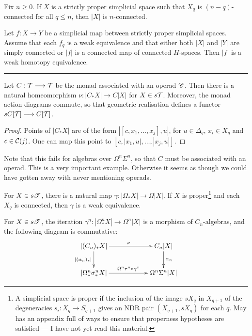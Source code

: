 \documentclass[11pt]{article}
\begin{document}
\begin{Operads}
\begin{thm*}[11.12]
Fix $n\geq0$. If $X$ is a strictly proper simplicial space such that $X_q$ is $(n-q)$-connected for all $q\leq n$, then $|X|$ is $n$-connected.
\end{thm*}
\begin{thm*}[11.13]
Let $f:X\to Y$ be a simplicial map between strictly proper simplicial spaces. Assume that each $f_q$ is a weak equivalence and that either both $|X|$ and $|Y|$ are simply connected or $|f|$ is a connected map of connected $H$-spaces. Then $|f|$ is a weak homotopy equivalence.
\end{thm*}
\hrule
\begin{thm*}[12.2]
Let $C:\mathcal{T}\longrightarrow\mathcal{T}$ be the monad associated with an operad $\mathscr{C}$. Then there is a natural homeomorphism $\nu:|C_*X|\to C|X|$ for $X\in s\mathcal{T}$. Moreover, the monad action diagrams commute, so that geometric realisation defines a functor $sC[\mathcal{T}]\longrightarrow C[\mathcal{T}]$.
\end{thm*}
\begin{proof}
Points of $|C_*X|$ are of the form $|[c,x_1,\ldots,x_j],u|$, for $u\in\Delta_q$, $x_i\in X_q$ and $c\in\mathcal{C}(j)$. One can map this point to $[c,|x_1,u|,\ldots,|x_j,u|]$.
\end{proof}
\noindent Note that this fails for algebras over $\Omega^n\Sigma^n$, so that $C$ must be associated with an operad. This is a very important example. Otherwise it seems as though we could have gotten away with never mentioning operads.
\begin{thm*}[12.3]
For $X\in s\mathscr{T}$, there is a natural map $\gamma:|\Omega_*X|\to\Omega|X|$. If $X$ is proper\footnote{A simplicial space is proper if the inclusion of the image $sX_q$ in $X_{q+1}$ of the degeneracies $s_i:X_q\to S_{q+1}$ gives an NDR pair $(X_{q+1},sX_q)$ for each $q$. May has an appendix full of ways to ensure that properness hypotheses are satisfied --- I have not yet read this material.} and each $X_q$ is connected, then $\gamma$ is a weak equivalence.
\end{thm*}
\begin{thm*}[12.4]
For $X\in s\mathscr{T}$, the iteration $\gamma^n:|\Omega^n_*X|\to\Omega^n|X|$ is a morphism of $C_n$-algebras, and the following diagram is commutative:
\[\xymatrix@C=2cm{
|(C_n)_*X|\ar[r]^{\nu}\ar[d]_{|(\alpha_n)_*|}&C_n|X|\ar[d]^{\alpha_n}\\
|\Omega^n_*\sigma^n_*X|\ar[r]^{\Omega^n\tau^n\circ\gamma^n}&\Omega^n\Sigma^n|X|
}\]
\end{thm*}

\end{Operads}
\end{document}
